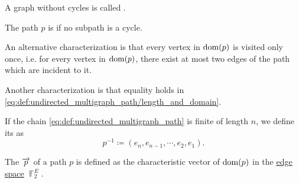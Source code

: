 \begin{definition}
\begin{thmenum}
    A graph without cycles is called .

     The path \( p \) is  if no subpath is a cycle.

    An alternative characterization is that every vertex in \( \operatorname{dom}(p) \) is visited only once, i.e. for every vertex in \( \operatorname{dom}(p) \), there exist at most two edges of the path which are incident to it.

    Another characterization is that equality holds in \eqref{eq:def:undirected_multigraph_path/length_and_domain}.

     If the chain \eqref{eq:def:undirected_multigraph_path} is finite of length \( n \), we define its  as
    \begin{equation*}
      p^{-1} \coloneqq (e_n, e_{n-1}, \cdots, e_2, e_1).
    \end{equation*}

     The  \( \overrightarrow{p} \) of a path \( p \) is defined as the characteristic vector of \( \operatorname{dom}(p) \) in the \hyperref[def:hypergraph_vector_spaces/edge]{edge space} \( \BbbF_2^E \).
  \end{thmenum}
\end{definition}

